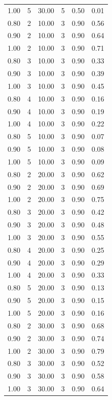\documentclass[12pt]{article}
\begin{document}
{\begin{longtable}{cccccc}
  1.00 &   5 & 30.00 &   5 & 0.50 & 0.01 \\ 
  0.80 &   2 & 10.00 &   3 & 0.90 & 0.56 \\ 
  0.90 &   2 & 10.00 &   3 & 0.90 & 0.64 \\ 
  1.00 &   2 & 10.00 &   3 & 0.90 & 0.71 \\ 
  0.80 &   3 & 10.00 &   3 & 0.90 & 0.33 \\ 
  0.90 &   3 & 10.00 &   3 & 0.90 & 0.39 \\ 
  1.00 &   3 & 10.00 &   3 & 0.90 & 0.45 \\ 
  0.80 &   4 & 10.00 &   3 & 0.90 & 0.16 \\ 
  0.90 &   4 & 10.00 &   3 & 0.90 & 0.19 \\ 
  1.00 &   4 & 10.00 &   3 & 0.90 & 0.22 \\ 
  0.80 &   5 & 10.00 &   3 & 0.90 & 0.07 \\ 
  0.90 &   5 & 10.00 &   3 & 0.90 & 0.08 \\ 
  1.00 &   5 & 10.00 &   3 & 0.90 & 0.09 \\ 
  0.80 &   2 & 20.00 &   3 & 0.90 & 0.62 \\ 
  0.90 &   2 & 20.00 &   3 & 0.90 & 0.69 \\ 
  1.00 &   2 & 20.00 &   3 & 0.90 & 0.75 \\ 
  0.80 &   3 & 20.00 &   3 & 0.90 & 0.42 \\ 
  0.90 &   3 & 20.00 &   3 & 0.90 & 0.48 \\ 
  1.00 &   3 & 20.00 &   3 & 0.90 & 0.55 \\ 
  0.80 &   4 & 20.00 &   3 & 0.90 & 0.25 \\ 
  0.90 &   4 & 20.00 &   3 & 0.90 & 0.29 \\ 
  1.00 &   4 & 20.00 &   3 & 0.90 & 0.33 \\ 
  0.80 &   5 & 20.00 &   3 & 0.90 & 0.13 \\ 
  0.90 &   5 & 20.00 &   3 & 0.90 & 0.15 \\ 
  1.00 &   5 & 20.00 &   3 & 0.90 & 0.16 \\ 
  0.80 &   2 & 30.00 &   3 & 0.90 & 0.68 \\ 
  0.90 &   2 & 30.00 &   3 & 0.90 & 0.74 \\ 
  1.00 &   2 & 30.00 &   3 & 0.90 & 0.79 \\ 
  0.80 &   3 & 30.00 &   3 & 0.90 & 0.52 \\ 
  0.90 &   3 & 30.00 &   3 & 0.90 & 0.58 \\ 
  1.00 &   3 & 30.00 &   3 & 0.90 & 0.64 \\ 

\end{longtable}}
\end{document}
